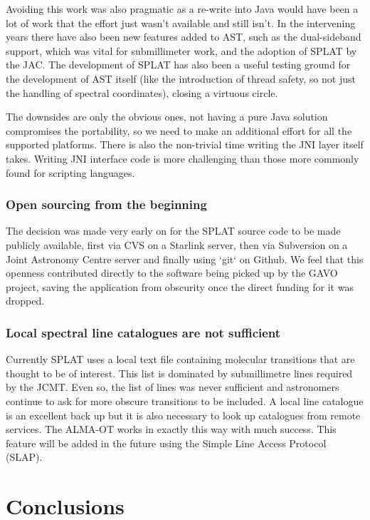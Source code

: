 \documentclass[final,authoryear,5p,times,twocolumn]{elsarticle}
\begin{document}
Avoiding this work was also pragmatic as a re-write into Java would
have been a lot of work that the effort just wasn't available and
still isn't. In the intervening years there have also been new
features added to AST, such as the dual-sideband support, which was
vital for submillimeter work, and the adoption of SPLAT by the
JAC. The development of SPLAT has also been a useful testing ground
for the development of AST itself (like the introduction of thread
safety, so not just the handling of spectral coordinates), closing a
virtuous circle.

The downsides are only the obvious ones, not having a pure Java
solution compromises the portability, so we need to make an additional
effort for all the supported platforms. There is also the non-trivial
time writing the JNI layer itself takes. Writing JNI interface code is
more challenging than those more commonly found for scripting
languages.

\subsubsection{Open sourcing from the beginning}

The decision was made very early on for the SPLAT source code to be
made publicly available, first via CVS on a Starlink server, then via
Subversion on a Joint Astronomy Centre server and finally using `git`
on Github. We feel that this openness contributed directly to the
software being picked up by the GAVO project, saving the application
from obscurity once the direct funding for it was dropped.

\subsubsection{Local spectral line catalogues are not sufficient}

Currently SPLAT uses a local text file containing molecular
transitions that are thought to be of interest. This list is dominated
by submillimetre lines required by the JCMT. Even so, the list of
lines was never sufficient and astronomers continue to ask for more
obscure transitions to be included. A local line catalogue is an
excellent back up but it is also necessary to look up catalogues from
remote services. The ALMA-OT \citep{2013ASPC..475..373W} works in
exactly this way with much success. This feature will be added in the 
future using the Simple Line Access Protocol (SLAP).

\section{Conclusions}
\end{document}
